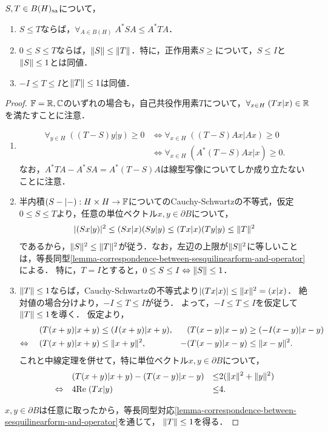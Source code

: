 \documentclass[uplatex,dvipdfmx]{jsreport}
\begin{document}
\begin{proposition}[自己共役作用素の順序]\label{prop-order-of-self-adjoint-operator}
    $S,T\in B(H)_{\mathrm{sa}}$について，
    \begin{enumerate}
        \item $S\le T$ならば，$\forall_{A\in B(H)}\;A^*SA\le A^*TA$．
        \item $0\le S\le T$ならば，$\|S\|\le\|T\|$．特に，正作用素$S\ge$について，$S\le I$と$\|S\|\le1$とは同値．
        \item $-I\le T\le I$と$\|T\|\le 1$は同値．
    \end{enumerate}
\end{proposition}
\begin{proof}
    $\mathbb{F}=\mathbb{R},\mathbb{C}$のいずれの場合も，自己共役作用素$T$について，$\forall_{x\in H}\;(Tx|x)\in\mathbb{R}$を満たすことに注意．
    \begin{enumerate}
        \item \begin{align*}
            \forall_{y\in H}\;((T-S)y|y)\ge0&\Leftrightarrow\forall_{x\in H}\;((T-S)Ax|Ax)\ge0\\
            &\Leftrightarrow\forall_{x\in H}\;(A^*(T-S)Ax|x)\ge0.
        \end{align*}
        なお，$A^*TA-A^*SA=A^*(T-S)A$は線型写像についてしか成り立たないことに注意．
        \item 半内積$(S-|-):H\times H\to\mathbb{F}$についてのCauchy-Schwartzの不等式，仮定$0\le S\le T$より，任意の単位ベクトル$x,y\in\partial B$について，
        \begin{align*}
            \lvert(Sx|y)\rvert^2\le(Sx|x)(Sy|y)\le(Tx|x)(Ty|y)\le\|T\|^2
        \end{align*}
        であるから，$\|S\|^2\le\|T\|^2$が従う．なお，左辺の上限が$\|S\|^2$に等しいことは，等長同型\ref{lemma-correspondence-between-sesquilinearform-and-operator}による．
        特に，$T=I$とすると，$0\le S\le I\Leftrightarrow\|S\|\le 1$．
        \item $\|T\|\le 1$ならば，Cauchy-Schwartzの不等式より$\lvert(Tx|x)\rvert\le\|x\|^2=(x|x)$．
        絶対値の場合分けより，$-I\le T\le I$が従う．
        よって，$-I\le T\le I$を仮定して$\|T\|\le 1$を導く．
        仮定より，
        \begin{align*}
            (T(x+y)|x+y)&\le(I(x+y)|x+y),&(T(x-y)|x-y)&\ge(-I(x-y)|x-y)\\
            \Leftrightarrow\quad(T(x+y)|x+y)&\le\|x+y\|^2,&-(T(x-y)|x-y)&\le\|x-y\|^2.
        \end{align*}
        これと中線定理を併せて，特に単位ベクトル$x,y\in\partial B$について，
        \begin{align*}
            &(T(x+y)|x+y)-(T(x-y)|x-y)&\le &2(\|x\|^2+\|y\|^2)\\
            \Leftrightarrow\quad&4\mathrm{Re}\;(Tx|y)&\le&4.
        \end{align*}
    \end{enumerate}
    $x,y\in\partial B$は任意に取ったから，等長同型対応\ref{lemma-correspondence-between-sesquilinearform-and-operator}を通じて，
    $\|T\|\le 1$を得る．
\end{proof}
\end{document}
